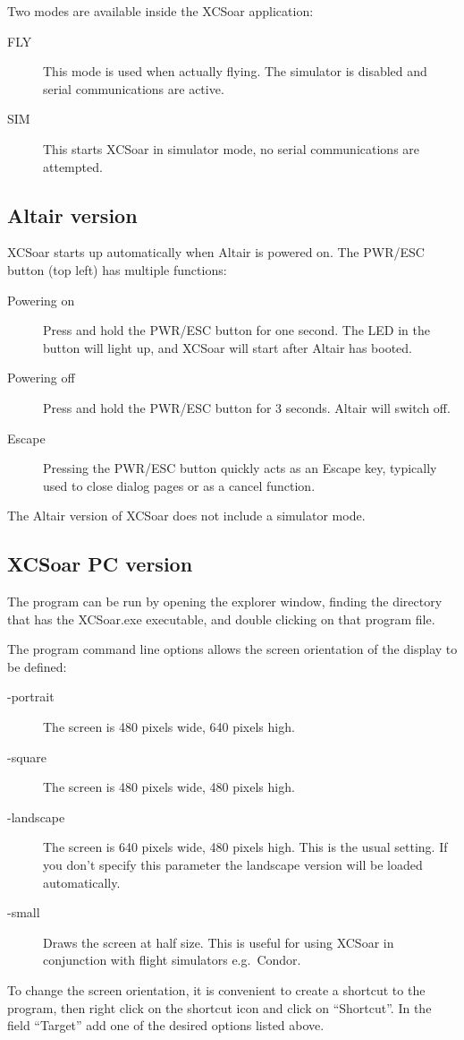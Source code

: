 Two modes are available inside the XCSoar application: 
\begin{description}
\item[FLY] This mode is used when actually flying.  The simulator is 
  disabled and serial communications are active. 
\item[SIM] This starts XCSoar in simulator mode, no serial communications
  are attempted.
\end{description}

\subsection*{Altair version}
XCSoar starts up automatically when Altair is powered on.
The PWR/ESC button (top left) has multiple functions:
\begin{description}
\item[Powering on]  Press and hold the PWR/ESC button for one second.
  The LED in the button will light up, and XCSoar will start after
  Altair has booted.
\item[Powering off]  Press and hold the PWR/ESC button for 3 seconds.
  Altair will switch off.
\item[Escape] Pressing the PWR/ESC button quickly acts as an
Escape key, typically used to close dialog pages or as a cancel function.
\end{description}

The Altair version of XCSoar does not include a simulator mode.

\subsection*{XCSoar PC version}
The program can be run by opening the explorer window, finding the directory
that has the XCSoar.exe executable, and double clicking on that program file.

The program command line options allows the screen orientation of
the display to be defined:
\begin{description}
\item[-portrait] The screen is 480 pixels wide, 640 pixels high.
\item[-square] The screen is 480 pixels wide, 480 pixels high.
\item[-landscape] The screen is 640 pixels wide, 480 pixels high. This is the
usual setting. If you don't specify this parameter the landscape version will be
loaded automatically.
\item[-small] Draws the screen at half size.  This is useful for using XCSoar in
 conjunction with flight simulators e.g.\ Condor.
\end{description}
To change the screen orientation, it is convenient to create a shortcut to the
program, then right click on the shortcut icon and click on ``Shortcut''. 
In the field ``Target'' add one of the desired options listed above.

